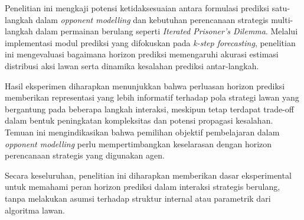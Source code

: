 Penelitian ini mengkaji potensi ketidaksesuaian antara formulasi prediksi satu-langkah dalam \textit{opponent modelling} dan kebutuhan perencanaan strategis multi-langkah dalam permainan berulang seperti \textit{Iterated Prisoner's Dilemma}. Melalui implementasi modul prediksi yang difokuskan pada \textit{k-step forecasting}, penelitian ini mengevaluasi bagaimana horizon prediksi memengaruhi akurasi estimasi distribusi aksi lawan serta dinamika kesalahan prediksi antar-langkah.

Hasil eksperimen diharapkan menunjukkan bahwa perluasan horizon prediksi memberikan representasi yang lebih informatif terhadap pola strategi lawan yang bergantung pada beberapa langkah interaksi, meskipun tetap terdapat trade-off dalam bentuk peningkatan kompleksitas dan potensi propagasi kesalahan. Temuan ini mengindikasikan bahwa pemilihan objektif pembelajaran dalam \textit{opponent modelling} perlu mempertimbangkan keselarasan dengan horizon perencanaan strategis yang digunakan agen.

Secara keseluruhan, penelitian ini diharapkan memberikan dasar eksperimental untuk memahami peran horizon prediksi dalam interaksi strategis berulang, tanpa melakukan asumsi terhadap struktur internal atau parametrik dari algoritma lawan.